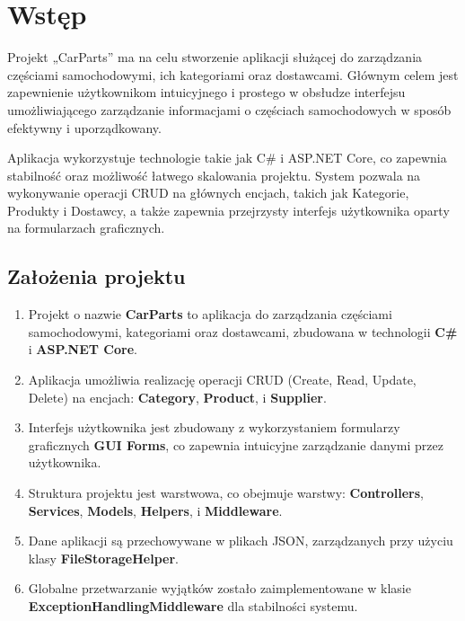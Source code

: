 ﻿\chapter*{Wstęp}

Projekt „CarParts” ma na celu stworzenie aplikacji służącej do zarządzania częściami samochodowymi, ich kategoriami oraz dostawcami. Głównym celem jest zapewnienie użytkownikom intuicyjnego i prostego w obsłudze interfejsu umożliwiającego zarządzanie informacjami o częściach samochodowych w sposób efektywny i uporządkowany.

Aplikacja wykorzystuje technologie takie jak C\# i ASP.NET Core, co zapewnia stabilność oraz możliwość łatwego skalowania projektu. System pozwala na wykonywanie operacji CRUD na głównych encjach, takich jak Kategorie, Produkty i Dostawcy, a także zapewnia przejrzysty interfejs użytkownika oparty na formularzach graficznych.

 \section*{Założenia projektu}
\begin{enumerate}
    \item Projekt o nazwie \textbf{CarParts} to aplikacja do zarządzania częściami samochodowymi, kategoriami oraz dostawcami, zbudowana w technologii \textbf{C\#} i \textbf{ASP.NET Core}.
    \item Aplikacja umożliwia realizację operacji CRUD (Create, Read, Update, Delete) na encjach: \textbf{Category}, \textbf{Product}, i \textbf{Supplier}.
    \item Interfejs użytkownika jest zbudowany z wykorzystaniem formularzy graficznych \textbf{GUI Forms}, co zapewnia intuicyjne zarządzanie danymi przez użytkownika.
    \item Struktura projektu jest warstwowa, co obejmuje warstwy: \textbf{Controllers}, \textbf{Services}, \textbf{Models}, \textbf{Helpers}, i \textbf{Middleware}.
    \item Dane aplikacji są przechowywane w plikach JSON, zarządzanych przy użyciu klasy \textbf{FileStorageHelper}.
    \item Globalne przetwarzanie wyjątków zostało zaimplementowane w klasie \textbf{ExceptionHandlingMiddleware} dla stabilności systemu.
\end{enumerate}


